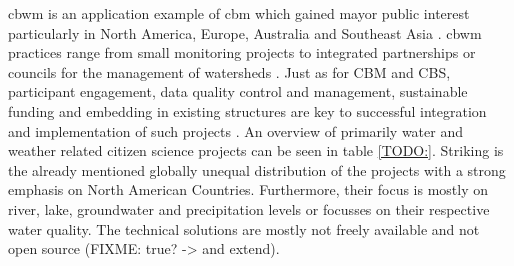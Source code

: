 \acrfull{cbwm} is an application example of \acrshort{cbm} which gained mayor public interest particularly in North America, Europe, Australia and Southeast Asia \autocite{kirschkeCitizenScienceProjects2022, koehlerCitizenParticipationCollaborative2008, livinglakescanadaElevatingCommunityBased2018}. \acrshort{cbwm} practices range from small monitoring projects to integrated partnerships or councils for the management of watersheds \autocite{westonCommunityBasedWaterMonitoring2015}. Just as for CBM and CBS, participant engagement, data quality control and management, sustainable funding and embedding in existing structures are key to successful integration and implementation of such projects \autocite{allenCommunityBasedWaterMonitoring2018,livinglakescanadaCommunityBasedWaterMonitoring2018,westonCommunityBasedWaterMonitoring2015}.
An overview of primarily water and weather related citizen science projects can be seen in table \ref{TODO:}. Striking is the already mentioned globally unequal distribution of the projects with a strong emphasis on North American Countries. Furthermore, their focus is mostly on river, lake, groundwater and precipitation levels or focusses on their respective water quality. The technical solutions are mostly not freely available and not open source (FIXME: true? -> and extend). 


